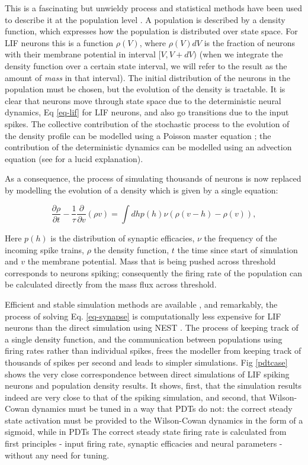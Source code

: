 \documentclass[10pt]{article}
\newcommand{\noteMP}[3]{(MP: \textcolor{blue}{#1})}
\begin{document}
{This is a fascinating but unwieldy process and statistical methods have been used to describe it at the population level \cite{stein1996,knight1972,omurtag2000simulation}.
A population is described by a density function, which expresses how the population is distributed over state space.
For LIF neurons this is a function $\rho(V)$, where $\rho(V)dV$ is the fraction of neurons with their membrane potential in interval $[V, V + dV)$ (when we integrate the density function over a certain state interval, we will refer to the  result as  the amount of \emph{mass} in that interval).
The initial distribution of the neurons in the population must be chosen, but the evolution of the density is tractable.
It is clear that neurons move through state space due to the deterministic neural dynamics, Eq \ref{eq-lif} for LIF neurons, and also go transitions due to the input spikes.
The collective contribution of the stochastic process to the evolution of the density profile can be  modelled using a Poisson master equation \cite{gardiner}; the contribution of the deterministic dynamics  can be modelled using an advection equation (see \cite{omurtag2000} for a lucid explanation). 


As a consequence, the process of simulating thousands of neurons is now replaced by modelling the evolution of a density which is given by a single equation:

\begin{equation}
\frac{\partial \rho}{\partial t} -\frac{1}{\tau}\frac{\partial}{\partial v}(\rho v) = \int dh p(h) \nu (\rho(v - h) -\rho(v)),
\label{eq-synapse}
\end{equation} 

Here $p(h)$ is the distribution of synaptic efficacies, $\nu$ the frequency of the incoming spike trains, $\rho$ the density function, $t$ the time since start of simulation and $v$ the membrane potential.
Mass that is being pushed across threshold corresponds to neurons spiking; consequently  the firing rate of the population can be calculated directly from the mass flux across threshold.

Efficient and stable simulation methods are available \cite{nykamp2000,dekamps2003,dekamps2013,iyer2013}, and remarkably, the process of solving Eq. \ref{eq-synapse} is computationally less expensive for LIF neurons than the direct simulation using NEST \cite{nykamp2000}.
The process of keeping track of a single density function, and the communication between populations using firing rates rather than individual spikes, frees the modeller from keeping track of thousands of spikes per second and leads to simpler simulations.
Fig \ref{pdtcase} shows the very close correspondence between direct simulations of LIF spiking neurons and population density results.
It shows, first, that the simulation results indeed are very close to that of the spiking simulation, and second, that Wilson-Cowan dynamics must be tuned in a way that PDTs do not: the correct steady state activation must be provided to the Wilson-Cowan dynamics in the form of a sigmoid, while in PDTs The correct steady state firing rate is calculated from first principles - input firing rate, synaptic efficacies and neural parameters - without any need for tuning. 


}
\end{document}
